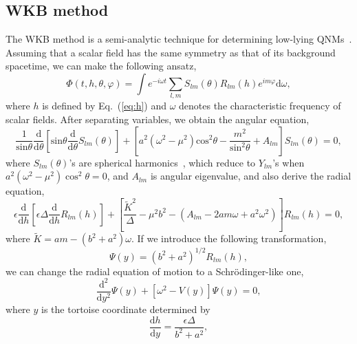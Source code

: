 \documentclass[12pt]{article}
\newcommand{\dif}{\mathrm{d}}
\begin{document}
\subsection{WKB method}
The WKB method is a semi-analytic technique for determining low-lying QNMs~\cite{Seidel:1989bp}. 
Assuming that a scalar field has the same symmetry as that of its background spacetime, we can make the following ansatz,
\begin{equation}\label{eq:Phi-SR}
    	\Phi(t,h,\theta,\varphi)=\int{e^{-i\omega t}\sum_{l,m}S_{lm}(\theta)R_{lm}(h)e^{im\varphi}}\dif\omega,
\end{equation}
where $h$ is defined by Eq.~(\ref{eq:h}) and $\omega$ denotes the characteristic frequency of scalar fields.
After separating variables, we obtain the angular equation,   
\begin{equation}\label{azimuthal}
    	\frac 1 {\mathrm{sin}\theta} \frac {\mathrm d} {{\mathrm d}\theta}\left[ \mathrm{sin}\theta\frac {\mathrm d} {{\mathrm d}\theta}S_{lm}(\theta)\right] 
    	+\left[ a^2\left( \omega^2-\mu^2\right) \mathrm{cos}^2\theta-\frac{m^2}{\mathrm{sin}^2\theta}+A_{lm}\right] S_{lm}(\theta)=0,
    \end{equation}
where $S_{lm}(\theta)$'s are spherical harmonics~\cite{Franzin:2022iai}, which reduce to $Y_{lm}$'s when $a^2(\omega^2-\mu^2)\cos^2\theta=0$, and $A_{lm}$ is angular eigenvalue, and also derive the radial equation, 
    \begin{equation}\label{radialh}
    	\epsilon \frac {\mathrm d}{{\mathrm d}h}\left[\epsilon \Delta\frac {\mathrm d}{{\mathrm d}h}R_{lm}(h)\right] +\left[ \frac{\tilde{K}^2}{\Delta}-\mu^2b^2-(A_{lm}-2am\omega+a^2\omega^2) \right] R_{lm}(h)=0,
    \end{equation}
  where $\tilde{K}=am-(b^2+a^2)\omega$.
If we introduce the following transformation,
    \begin{equation}\label{eq:transform}
        \Psi(y)=(b^2+a^2)^{1/2}R_{lm}(h),
    \end{equation}
we can change the radial equation of motion  to a Schr\"odinger-like one,
    \begin{equation}\label{WKB}
    	  \frac {\mathrm d^2}{{\mathrm d}y^2}\Psi(y) +\left[ \omega^2-V(y)\right]  \Psi(y)=0,
    \end{equation}
where $y$ is the tortoise coordinate determined by 
    \begin{equation}
        \frac{\mathrm d h}{{\mathrm d}y}=\frac{\epsilon\Delta}{b^2+a^2},
    \end{equation}
\end{document}
